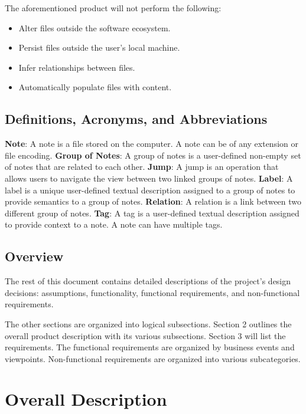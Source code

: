 \documentclass{article}
\begin{document}
The aforementioned product will not perform the following:

\begin{itemize}
    \item Alter files outside the software ecosystem.
    \item Persist files outside the user's local machine.
    \item Infer relationships between files.
    \item Automatically populate files with content.
\end{itemize}

\subsection{Definitions, Acronyms, and Abbreviations}
\textbf{Note}: A note is a file stored on the computer. A note can be of any extension or file encoding.
\textbf{Group of Notes}: A group of notes is a user-defined non-empty set of notes that are related to each other.
\textbf{Jump}: A jump is an operation that allows users to navigate the view between two linked groups of notes.
\textbf{Label}: A label is a unique user-defined textual description assigned to a group of notes to provide semantics to a group of notes.
\textbf{Relation}: A relation is a link between two different group of notes.
\textbf{Tag}: A tag is a user-defined textual description assigned to provide context to a note. A note can have multiple tags.

\subsection{Overview}
The rest of this document contains detailed descriptions of the project's design decisions: assumptions, functionality, functional requirements, and non-functional requirements.

The other sections are organized into logical subsections. Section 2 outlines the overall product description with its various subsections. Section 3 will list the requirements. The functional requirements are organized by business events and viewpoints. Non-functional requirements are organized into various subcategories.

\section{Overall Description}
\end{document}
